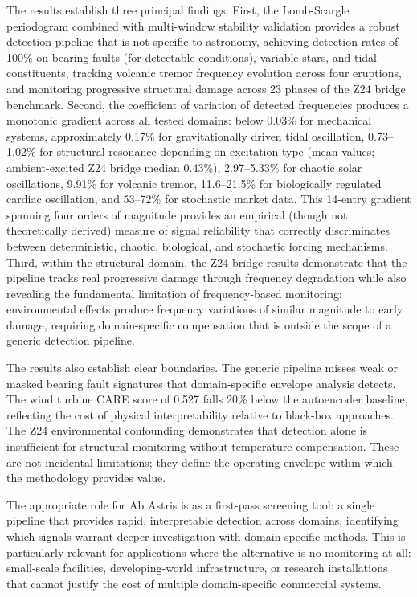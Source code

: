 \documentclass[11pt,a4paper]{article}
\begin{document}
The results establish three principal findings. First, the Lomb-Scargle periodogram combined with multi-window stability validation provides a robust detection pipeline that is not specific to astronomy, achieving detection rates of 100\% on bearing faults (for detectable conditions), variable stars, and tidal constituents, tracking volcanic tremor frequency evolution across four eruptions, and monitoring progressive structural damage across 23 phases of the Z24 bridge benchmark. Second, the coefficient of variation of detected frequencies produces a monotonic gradient across all tested domains: below 0.03\% for mechanical systems, approximately 0.17\% for gravitationally driven tidal oscillation, 0.73--1.02\% for structural resonance depending on excitation type (mean values; ambient-excited Z24 bridge median 0.43\%), 2.97--5.33\% for chaotic solar oscillations, 9.91\% for volcanic tremor, 11.6--21.5\% for biologically regulated cardiac oscillation, and 53--72\% for stochastic market data. This 14-entry gradient spanning four orders of magnitude provides an empirical (though not theoretically derived) measure of signal reliability that correctly discriminates between deterministic, chaotic, biological, and stochastic forcing mechanisms. Third, within the structural domain, the Z24 bridge results demonstrate that the pipeline tracks real progressive damage through frequency degradation while also revealing the fundamental limitation of frequency-based monitoring: environmental effects produce frequency variations of similar magnitude to early damage, requiring domain-specific compensation that is outside the scope of a generic detection pipeline.

The results also establish clear boundaries. The generic pipeline misses weak or masked bearing fault signatures that domain-specific envelope analysis detects. The wind turbine CARE score of 0.527 falls 20\% below the autoencoder baseline, reflecting the cost of physical interpretability relative to black-box approaches. The Z24 environmental confounding demonstrates that detection alone is insufficient for structural monitoring without temperature compensation. These are not incidental limitations; they define the operating envelope within which the methodology provides value.

The appropriate role for Ab Astris is as a first-pass screening tool: a single pipeline that provides rapid, interpretable detection across domains, identifying which signals warrant deeper investigation with domain-specific methods. This is particularly relevant for applications where the alternative is no monitoring at all: small-scale facilities, developing-world infrastructure, or research installations that cannot justify the cost of multiple domain-specific commercial systems.
\end{document}
